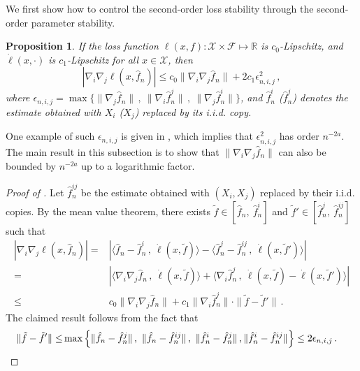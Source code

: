\documentclass[11pt]{article}
\theoremstyle{plain}
\newtheorem{proposition}[theorem]{Proposition}
\newcommand{\X}{{\mathcal{X}}}
\begin{document}
We first show how to control the second-order loss stability through the second-order parameter stability.
\begin{proposition}
    \label{pro:6.2-2nd-order-parameter-to-loss}
    If the loss function $\ell(x,f):\X\times\mathcal F\mapsto \mathbb R$ 
    is $c_0$-Lipschitz, and $\dot\ell(x,\cdot)$ is $c_1$-Lipschitz for all $x\in\X$,
    then
    $$|\nabla_i\nabla_j\ell(x,\hat f_n)|\le c_0\|\nabla_i\nabla_j\hat f_n\|+2c_1\epsilon_{n,i,j}^2\,,$$
    where $\epsilon_{n,i,j}=\max\{\|\nabla_j\hat f_n\|\,,~\|\nabla_i\hat f_n^j\|\,,~\|\nabla_j\hat f_n^i\|\}$, and
     $\hat f_n^i$ ($\hat f_n^j$) denotes the estimate obtained with $X_i$ ($X_j$) replaced by its i.i.d. copy.
\end{proposition}
One example of such $\epsilon_{n,i,j}$ is given in , which implies that $\epsilon_{n,i,j}^2$ has order $n^{-2a}$.  The main result in this subsection is to show that $\|\nabla_i\nabla_j\hat f_n\|$ can also be bounded by $n^{-2a}$ up to a logarithmic factor.

\begin{proof}
    [Proof of ]
    Let $\hat f_n^{ij}$ be the estimate obtained with $(X_i,X_j)$ replaced by their i.i.d. copies.
    By the mean value theorem, there exists $\tilde f\in[\hat f_n,~\hat f_n^i]$ and $\tilde f'\in[\hat f_n^j,~\hat f_n^{ij}]$ such that
    \begin{align*}
    |\nabla_i\nabla_j\ell(x,\hat f_n)| = & \left|\langle\hat f_n-\hat f_n^i\,,~\dot\ell(x,\tilde f)\rangle-\langle \hat f_n^j-\hat f_n^{ij}\,,~\dot\ell(x,\tilde f')\rangle\right|\\
    =& \left|\langle\nabla_i\nabla_j \hat f_n\,,~\dot\ell(x,\tilde f)\rangle +
    \langle \nabla_i \hat f_n^j\,,~ \dot\ell(x,\tilde f)-\dot\ell(x,\tilde f')\rangle\right|\\
    \le & c_0\|\nabla_i\nabla_j\hat f_n\| + c_1\|\nabla_i\hat f_n^j\| \cdot\|\tilde f-\tilde f'\|\,.
    \end{align*}
    The claimed result follows from the fact that
    \begin{align*}
        \|\tilde f-\tilde f'\|\le & \max\left\{\|\hat f_n-\hat f_n^j\|\,,~\|\hat f_n-\hat f_n^{ij}\|\,,~\|\hat f_n^i-\hat f_n^j\|\,,\|\hat f_n^i-\hat f_n^{ij}\|\right\}\le  2\epsilon_{n,i,j}\,. \qedhere
    \end{align*}
\end{proof}
\end{document}
